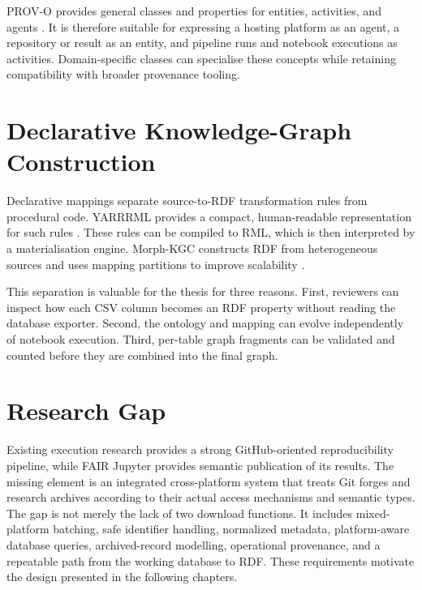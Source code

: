 PROV-O provides general classes and properties for entities, activities, and agents \cite{prov2013}. It is therefore suitable for expressing a hosting platform as an agent, a repository or result as an entity, and pipeline runs and notebook executions as activities. Domain-specific classes can specialise these concepts while retaining compatibility with broader provenance tooling.

\section{Declarative Knowledge-Graph Construction}

Declarative mappings separate source-to-RDF transformation rules from procedural code. YARRRML provides a compact, human-readable representation for such rules \cite{heyvaert2018yarrrml}. These rules can be compiled to RML, which is then interpreted by a materialisation engine. Morph-KGC constructs RDF from heterogeneous sources and uses mapping partitions to improve scalability \cite{arenas2024morph,morphdocs}.

This separation is valuable for the thesis for three reasons. First, reviewers can inspect how each CSV column becomes an RDF property without reading the database exporter. Second, the ontology and mapping can evolve independently of notebook execution. Third, per-table graph fragments can be validated and counted before they are combined into the final graph.

\section{Research Gap}

Existing execution research provides a strong GitHub-oriented reproducibility pipeline, while FAIR Jupyter provides semantic publication of its results. The missing element is an integrated cross-platform system that treats Git forges and research archives according to their actual access mechanisms and semantic types. The gap is not merely the lack of two download functions. It includes mixed-platform batching, safe identifier handling, normalized metadata, platform-aware database queries, archived-record modelling, operational provenance, and a repeatable path from the working database to RDF. These requirements motivate the design presented in the following chapters.
